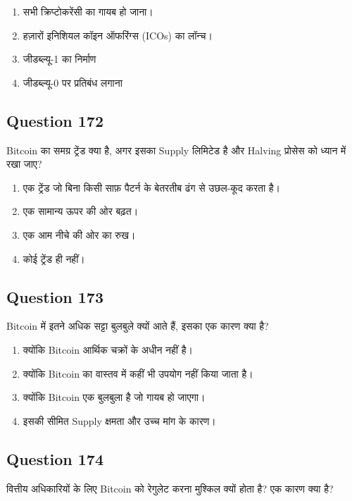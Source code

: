 \documentclass[12pt,a4paper]{article}
\begin{document}
\begin{enumerate}[label=\Alph*., leftmargin=*]
\item सभी क्रिप्टोकरेंसी का गायब हो जाना।
\item हज़ारों इनिशियल कॉइन ऑफरिंग्स (ICOs) का लॉन्च।
\item जीडब्ल्यू-1 का निर्माण
\item जीडब्ल्यू-0 पर प्रतिबंध लगाना
\end{enumerate}

\bigskip


\subsection*{Question 172}
Bitcoin का समग्र ट्रेंड क्या है, अगर इसका Supply लिमिटेड है और Halving प्रोसेस को ध्यान में रखा जाए?

\begin{enumerate}[label=\Alph*., leftmargin=*]
\item एक ट्रेंड जो बिना किसी साफ़ पैटर्न के बेतरतीब ढंग से उछल-कूद करता है।
\item एक सामान्य ऊपर की ओर बढ़त।
\item एक आम नीचे की ओर का रुख।
\item कोई ट्रेंड ही नहीं।
\end{enumerate}

\bigskip


\subsection*{Question 173}
Bitcoin में इतने अधिक सट्टा बुलबुले क्यों आते हैं, इसका एक कारण क्या है?

\begin{enumerate}[label=\Alph*., leftmargin=*]
\item क्योंकि Bitcoin आर्थिक चक्रों के अधीन नहीं है।
\item क्योंकि Bitcoin का वास्तव में कहीं भी उपयोग नहीं किया जाता है।
\item क्योंकि Bitcoin एक बुलबुला है जो गायब हो जाएगा।
\item इसकी सीमित Supply क्षमता और उच्च मांग के कारण।
\end{enumerate}

\bigskip


\subsection*{Question 174}
वित्तीय अधिकारियों के लिए Bitcoin को रेगुलेट करना मुश्किल क्यों होता है? एक कारण क्या है?
\end{document}
